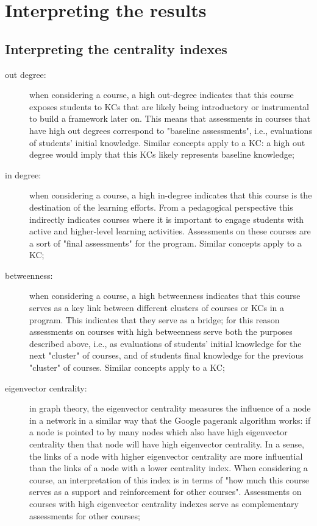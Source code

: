 \section{Interpreting the results}
\label{sec:interpreting_the_results}

\subsection{Interpreting the centrality indexes}

\begin{description}

	\item[out degree:] when considering a course, a high out-degree indicates that this course exposes students to \acp{KC} that are likely being introductory or instrumental to build a framework later on. This means that assessments in courses that have high out degrees correspond to "baseline assessments", i.e., evaluations of students' initial knowledge. Similar concepts apply to a \ac{KC}: a high out degree would imply that this \acp{KC} likely represents baseline knowledge;

	\item[in degree:] when considering a course, a high in-degree indicates that this course is the destination of the learning efforts. From a pedagogical perspective this indirectly indicates courses where it is important to engage students with active and higher-level learning activities. Assessments on these courses are a sort of "final assessments" for the program. Similar concepts apply to a \ac{KC};

	\item[betweenness:] when considering a course, a high betweenness indicates that this course serves as a key link between different clusters of courses or \acp{KC} in a program. This indicates that they serve as a bridge; for this reason assessments on courses with high betweenness serve both the purposes described above, i.e., as evaluations of students' initial knowledge for the next "cluster" of courses, and of students final knowledge for the previous "cluster" of courses. Similar concepts apply to a \ac{KC};

	\item[eigenvector centrality:] in graph theory, the eigenvector centrality measures the influence of a node in a network in a similar way that the Google pagerank algorithm works: if a node is pointed to by many nodes which also have high eigenvector centrality then that node will have high eigenvector centrality. In a sense, the links of a node with higher eigenvector centrality are more influential than the links of a node with a lower centrality index. When considering a course, an interpretation of this index is in terms of "how much this course serves as a support and reinforcement for other courses". Assessments on courses with high eigenvector centrality indexes serve as complementary assessments for other courses;


\end{description}
